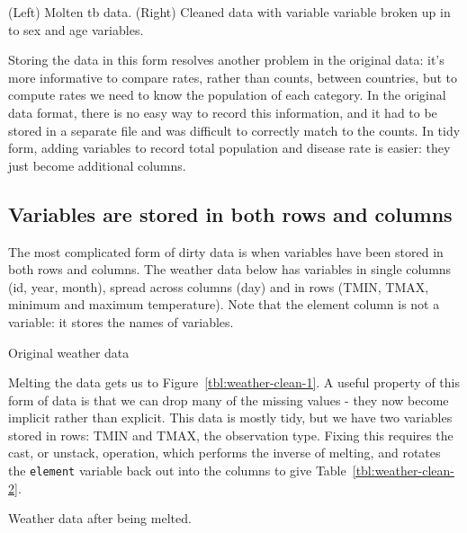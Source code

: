 \documentclass[oneside]{article}
\begin{document}
\begin{table}[htbp]
  \centering
  
  
  \caption{(Left) Molten tb data. (Right) Cleaned data with variable variable broken up in to sex and age variables.}
  \label{tbl:tb-clean}
\end{table}

Storing the data in this form resolves another problem in the original data: it's more informative to compare rates, rather than counts, between countries, but to compute rates we need to know the population of each category. In the original data format, there is no easy way to record this information, and it had to be stored in a separate file and was difficult to correctly match to the counts. In tidy form, adding variables to record total population and disease rate is easier: they just become additional columns.

\subsection{Variables are stored in both rows and columns}

The most complicated form of dirty data is when variables have been stored in both rows and columns. The weather data below has variables in single columns (id, year, month), spread across columns (day) and in rows (TMIN, TMAX, minimum and maximum temperature).  Note that the element column is not a variable: it stores the names of variables.

\begin{table}[htbp]
  \centering
  
  \caption{Original weather data}
  \label{tbl:weather-raw}
\end{table}

Melting the data gets us to Figure~\ref{tbl:weather-clean-1}.  A useful property of this form of data is that we can drop many of the missing values - they now become implicit rather than explicit. This data is mostly tidy, but we have two variables stored in rows: TMIN and TMAX, the observation type. Fixing this requires the cast, or unstack, operation, which performs the inverse of melting, and rotates the {\tt element} variable back out into the columns to give Table~\ref{tbl:weather-clean-2}.

\begin{table}[htbp]
  \centering
  
  \caption{Weather data after being melted.}
  \label{tbl:weather-clean-1}
\end{table}
\end{document}
